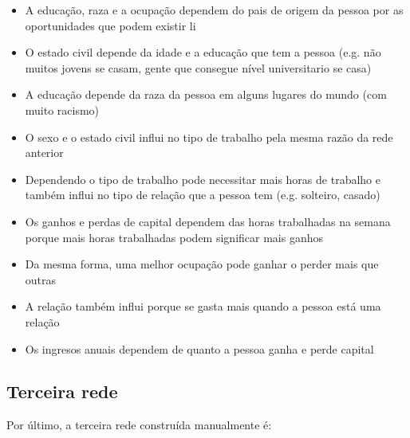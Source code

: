 	\begin{itemize}
		\item A educação, raza e a ocupação dependem do pais de origem da pessoa por as oportunidades que podem existir li
		\item O estado civil depende da idade e a educação que tem a pessoa (e.g. não muitos jovens se casam, gente que consegue nível universitario se casa)
		\item A educação depende da raza da pessoa em alguns lugares do mundo (com muito racismo)
		\item O sexo e o estado civil influi no tipo de trabalho pela mesma razão da rede anterior
		\item Dependendo o tipo de trabalho pode necessitar mais horas de trabalho e também influi no tipo de relação que a pessoa tem (e.g. solteiro, casado)
		\item Os ganhos e perdas de capital dependem das horas trabalhadas na semana porque mais horas trabalhadas podem significar mais ganhos
		\item Da mesma forma, uma melhor ocupação pode ganhar o perder mais que outras
		\item A relação também influi porque se gasta mais quando a pessoa está uma relação
		\item Os ingresos anuais dependem de quanto a pessoa ganha e perde capital
	\end{itemize}

\subsection{Terceira rede}
	Por último, a terceira rede construída manualmente é:
	\begin{comment}
	\begin{itemize}
		\item age: capital-gain,capital-loss
		\item marital-status: workclass
		\item workclass: hours-per-week
		\item hours-per-week: annual-income
		\item native-country: race,capital-gain,capital-loss
		\item race: relationship
		\item sex: capital-gain,capital-loss
		\item relationship: marital-status
		\item occupation: workclass
		\item education-num: workclass
		\item education: workclass
		\item capital-gain: education,education-num
		\item capital-loss: education,education-num
		\item annual-income:
	\end{itemize}
	\end{comment}
	
